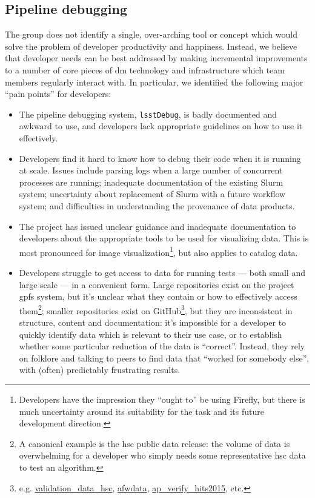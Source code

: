 \subsection{Pipeline debugging}
\label{sec:design:debug}

The group does not identify a single, over-arching tool or concept which would
solve the problem of developer productivity and happiness. Instead, we believe
that developer needs can be best addressed by making incremental improvements
to a number of core pieces of \gls{dm} technology and infrastructure which
team members regularly interact with. In particular, we identified the
following major ``pain points'' for developers:

\begin{itemize}

  \item{The pipeline debugging system, \texttt{lsstDebug}, is badly documented
  and awkward to use, and developers lack appropriate guidelines on how to use
  it effectively.}

  \item{Developers find it hard to know how to debug their code when it is
  running at scale. Issues include parsing logs when a large number of
  concurrent processes are running; inadequate documentation of the existing
  Slurm system; uncertainty about replacement of Slurm with a future workflow
  system; and difficulties in understanding the \gls{provenance} of data
  products.}

  \item{The project has issued unclear guidance and inadequate documentation
  to developers about the appropriate tools to be used for visualizing data.
  This is most pronounced for image visualization\footnote{Developers have the
  impression they ``ought to'' be using Firefly, but there is much uncertainty
  around its suitability for the task and its future development direction.},
  but also applies to catalog data.}

  \item{Developers struggle to get access to data for running tests --- both
  small and large scale --- in a convenient form. Large repositories exist on
  the project \gls{gpfs} system, but it's unclear what they contain or how
  to effectively access them\footnote{A canonical example is the \gls{hsc}
  public data release: the volume of data is overwhelming for a developer who
  simply needs some representative \gls{hsc} data to test an algorithm.};
  smaller repositories exist on GitHub\footnote{e.g.
  \href{https://github.com/lsst/validation_data_hsc}{validation\_data\_hsc},
  \href{https://github.com/lsst/afwdata}{afwdata},
  \href{https://github.com/lsst/ap_verify_hits2015}{ap\_verify\_hits2015},
  etc.}, but they are inconsistent in structure, content and documentation:
  it's impossible for a developer to quickly identify data which is relevant
  to their use case, or to establish whether some particular reduction of the
  data is ``correct''. Instead, they rely on folklore and talking to peers to
  find data that ``worked for somebody else'', with (often) predictably
  frustrating results.}

\end{itemize}

